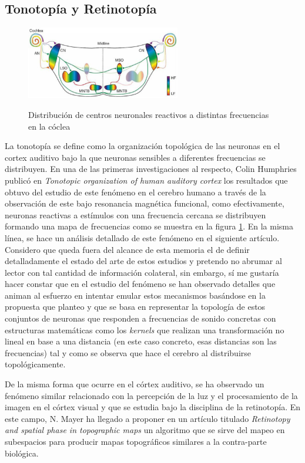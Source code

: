 \documentclass[10pt,a4paper]{report}
\begin{document}
\subsection{Tonotopía y Retinotopía}
\begin{figure}[h!]{}
    \centering
    \includegraphics[width=0.6\textwidth]{img/Hearing_sound_localization_circuits_brainstem.jpg}
    \label{fig:DistribucionFreq}
    \caption{Distribución de centros neuronales reactivos a distintas frecuencias en la cóclea}
\end{figure}

La tonotopía se define como la organización topológica de las neuronas en el cortex auditivo bajo la que neuronas sensibles a diferentes frecuencias se distribuyen. En una de las primeras investigaciones al respecto, Colin Humphries publicó en \textit{Tonotopic organization of human auditory cortex}\citep{Humphries20101202} los resultados que obtuvo del estudio de este fenómeno en el cerebro humano a través de la observación de este bajo resonancia magnética funcional, como efectivamente, neuronas reactivas a estímulos con una frecuencia cercana se distribuyen formando una mapa de frecuencias como se muestra en la figura \ref{fig:DistribucionFreq}. En la misma línea, se hace un análisis detallado de este fenómeno en el siguiente artículo\citep{Clopton19741}. Considero que queda fuera del alcance de esta memoria el de definir detalladamente el estado del arte de estos estudios y pretendo no abrumar al lector con tal cantidad de información colateral, sin embargo, sí me gustaría hacer constar que en el estudio del fenómeno se han observado detalles que animan al esfuerzo en intentar emular estos mecanismos basándose en la propuesta que planteo y que se basa en representar la topología de estos conjuntos de neuronas que responden a frecuencias de sonido concretas con estructuras matemáticas como los \textit{kernels} que realizan una transformación no lineal en base a una distancia (en este caso concreto, esas distancias son las frecuencias) tal y como se observa que hace el cerebro al distribuirse topológicamente.  

De la misma forma que ocurre en el córtex auditivo, se ha observado un fenómeno similar relacionado con la percepción de la luz y el procesamiento de la imagen en el córtex visual y que se estudia bajo la disciplina de la retinotopía. En este campo, N. Mayer ha llegado a proponer en un artículo titulado \textit{Retinotopy and spatial phase in topographic maps}\citep{Mayer2000447} un algoritmo que se sirve del mapeo en subespacios para producir mapas topográficos similares a la contra-parte biológica.
\end{document}
